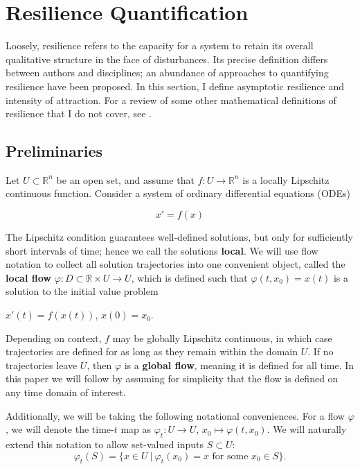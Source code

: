 \section{Resilience Quantification}
\label{sec:resilience}

Loosely, resilience refers to the capacity for a system to retain its overall qualitative structure in the face of disturbances. Its precise definition differs between authors and disciplines; an abundance of approaches to quantifying resilience have been proposed. 
%
In this section, I define asymptotic resilience and intensity of attraction. 
%
For a review of some other mathematical definitions of resilience that I do not cover, see \cite{meyerMathematicalReviewResilience2016}.


\subsection{Preliminaries}
Let $U \subset \mathbb{R}^n$ be an open set, and assume that $f : U \to \mathbb{R}^n$ is a locally Lipschitz continuous function. Consider a system of ordinary differential equations (ODEs) 

\begin{equation}
	\label{eqn:ode}
	x' = f(x)
\end{equation}

The Lipschitz condition guarantees well-defined solutions, but only for sufficiently short intervals of time; hence we call the solutions \textbf{local}. We will use flow notation to collect all solution trajectories into one convenient object, called the \textbf{local flow} $\varphi: D \subset \mathbb{R} \times U \to U$, which is defined such that $\varphi(t,x_0) = x(t)$ is a solution to the initial value problem \begin{center}
	$x'(t) = f(x(t))$, \hspace{0.25in} $x(0) = x_0$. 
\end{center}

Depending on context, $f$ may be globally Lipschitz continuous, in which case trajectories are defined for as long as they remain within the domain $U$. If no trajectories leave $U$, then $\varphi$ is a \textbf{global flow}, meaning it is defined for all time. In this paper we will follow \cite{meyerMetricPropertiesAttractors2019} by assuming for simplicity that the flow is defined on any time domain of interest. 

Additionally, we will be taking the following notational conveniences. For a flow $\varphi$, we will denote the time-$t$ map as $\varphi_t: U \to U$, $x_0 \mapsto \varphi(t,x_0)$. We will naturally extend this notation to allow set-valued inputs $S\subset U$: $$\varphi_t(S) = \{x\in U ~| ~\varphi_t(x_0) = x \text{ for some } x_0 \in S\}.$$

